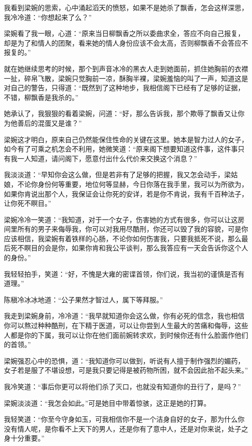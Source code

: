 我看到梁婉的思索，心中涌起滔天的愤怒，如果不是她杀了飘香，怎会这样深思，我冷冷道：“你想起来了么？”

梁婉看了我一眼，心道：“原来当日柳飘香之所以委曲求全，答应不向自己报复，却是为了和情人的团聚，看来她的情人身份应该不会太高，否则柳飘香不会答应不报复的。”

就在她继续思考的时候，那个到声音冰冷的黑衣人走到她面前，抓住她胸前的衣襟一扯，碎帛飞散，梁婉只觉胸前一凉，酥胸半裸，梁婉羞恼的叫了一声，知道这是对自己的警告，只得道：“既然到了这种地步，我相信阁下已经有了足够的证据，不错，柳飘香是我杀的。”

她承认了，我狠狠的看着梁婉，问道：“好，那么告诉我，那个欺辱了飘香又让你为他善后的混蛋又是谁？”

梁婉这才明白，原来自己仍然能保住性命的关键在这里。她本是智力过人的女子，如今有了可乘之机怎会不利用，她微笑道：“原来阁下想要知道这件事，这件事只有我一人知道，请问阁下，愿意付出什么代价来交换这个消息？”

我淡淡道：“早知你会这么做，但是若非有了足够的把握，我又怎会动手，梁姑娘，不论你身份何等重要，地位何等显赫，今日你落在我手里，我可以为所欲为，如果你肯说出那个人，我保证会让你死的安详，若是你不肯说，我有千百种法子，让你死不瞑目。”

梁婉冷冷一笑道：“我知道，对于一个女子，伤害她的方式有很多，你可以让这房间里所有的男子来侮辱我，你可以对我用尽酷刑，你还可以毁了我的容貌，可是你应该相信，我梁婉有着铁样的心肠，不论你如何伤害我，只要我抵死不说，那么最后死不瞑目的会是你，如果你肯和我公平谈判，那么我答应有一天会告诉你这个人的身份。”

我轻轻拍手，笑道：“好，不愧是大雍的密谍首领，你们说，我当初的谨慎是否有道理。”

陈稹冷冰冰地道：“公子果然才智过人，属下等拜服。”

我走到梁婉身前，冷冷道：“我早就知道你会这么做，你有必死的信念，我也相信你可以熬过种种酷刑，在下精于医道，可以让你尝到人生最大的苦痛和侮辱，这些人都是你的下属，我可以让你在他们面前婉转求欢，到时候你还有什么脸面作他们的首领。”

梁婉强忍心中的恐惧，道：“我知道你可以做到，听说有人擅于制作强烈的媚药，女子若是服了不堪设想，可是我只要记得是被药物所困，就不会因此抬不起头来。”

我冷笑道：“事后你更可以将他们杀了灭口，也就没有知道你的丑行了，是吗？”

梁婉淡淡道：“我怎会如此。”可是她目中带着惊骇，这正是她的打算。

我轻笑道：“你至今守身如玉，可我相信你不是一个洁身自好的女子，那为什么你没有情人呢，是你看不上天下的男人，还是你有了意中人，还是对你来说，处子之身十分重要。”


